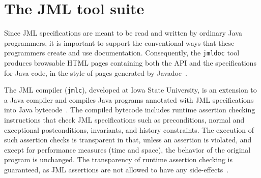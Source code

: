 \section{The JML tool suite}
\label{tools}

Since JML specifications are meant to be read and written by ordinary
Java programmers, it is important to support the conventional ways
that these programmers create and use documentation.  Consequently,
the {\tt jmldoc} tool
produces browsable HTML pages containing both the
API and the specifications for Java code, in the style of pages
generated by Javadoc~\cite{Friendly95}.

The JML compiler (\texttt{jmlc}), developed at Iowa State University,
is an extension to a Java compiler and compiles Java programs
annotated with JML specifications into Java
bytecode~\cite{Cheon03,Cheon-Leavens02b}.  The compiled bytecode includes
runtime assertion checking instructions that check JML specifications
such as preconditions, normal and exceptional postconditions,
invariants, and history constraints.  The execution of such assertion
checks is transparent in that, unless an assertion is violated, and
except for performance measures (time and space), the behavior of the
original program is unchanged.  The transparency of runtime assertion
checking is guaranteed, as JML assertions are not allowed to have any
side-effects~\cite{Leavens-etal03a}.


